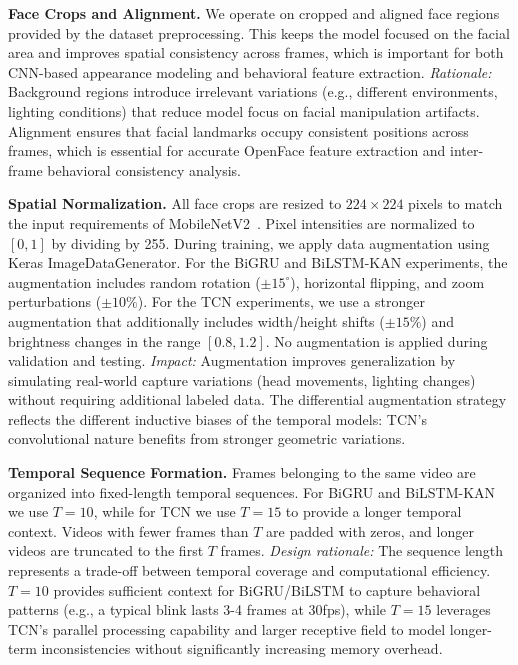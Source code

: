 \documentclass[conference]{IEEEtran}
\begin{document}
\textbf{Face Crops and Alignment.} We operate on cropped and aligned face regions provided by the dataset preprocessing. This keeps the model focused on the facial area and improves spatial consistency across frames, which is important for both CNN-based appearance modeling and behavioral feature extraction. \textit{Rationale:} Background regions introduce irrelevant variations (e.g., different environments, lighting conditions) that reduce model focus on facial manipulation artifacts. Alignment ensures that facial landmarks occupy consistent positions across frames, which is essential for accurate OpenFace feature extraction and inter-frame behavioral consistency analysis.

\textbf{Spatial Normalization.} All face crops are resized to $224 \times 224$ pixels to match the input requirements of MobileNetV2~\cite{b17}. Pixel intensities are normalized to $[0, 1]$ by dividing by 255. During training, we apply data augmentation using Keras ImageDataGenerator. For the BiGRU and BiLSTM-KAN experiments, the augmentation includes random rotation ($\pm 15^\circ$), horizontal flipping, and zoom perturbations ($\pm 10\%$). For the TCN experiments, we use a stronger augmentation that additionally includes width/height shifts ($\pm 15\%$) and brightness changes in the range $[0.8, 1.2]$. No augmentation is applied during validation and testing. \textit{Impact:} Augmentation improves generalization by simulating real-world capture variations (head movements, lighting changes) without requiring additional labeled data. The differential augmentation strategy reflects the different inductive biases of the temporal models: TCN's convolutional nature benefits from stronger geometric variations.

\textbf{Temporal Sequence Formation.} Frames belonging to the same video are organized into fixed-length temporal sequences. For BiGRU and BiLSTM-KAN we use $T=10$, while for TCN we use $T=15$ to provide a longer temporal context. Videos with fewer frames than $T$ are padded with zeros, and longer videos are truncated to the first $T$ frames. \textit{Design rationale:} The sequence length represents a trade-off between temporal coverage and computational efficiency. $T=10$ provides sufficient context for BiGRU/BiLSTM to capture behavioral patterns (e.g., a typical blink lasts 3-4 frames at 30fps), while $T=15$ leverages TCN's parallel processing capability and larger receptive field to model longer-term inconsistencies without significantly increasing memory overhead.
\end{document}
